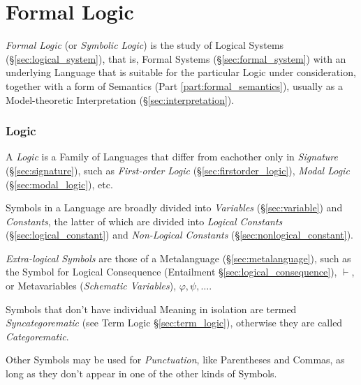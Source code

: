 \part{Formal Logic}\label{sec:formal_logic}

\emph{Formal Logic} (or \emph{Symbolic Logic}) is the study of Logical
Systems (\S\ref{sec:logical_system}), that is, Formal Systems
(\S\ref{sec:formal_system}) with an underlying Language that is
suitable for the particular Logic under consideration, together with a
form of Semantics (Part \ref{part:formal_semantics}), usually as a
Model-theoretic Interpretation (\S\ref{sec:interpretation}).



\section{Logic}\label{sec:logic}

A \emph{Logic} is a Family of Languages that differ from eachother
only in \emph{Signature} (\S\ref{sec:signature}), such as
\emph{First-order Logic} (\S\ref{sec:firstorder_logic}), \emph{Modal
  Logic} (\S\ref{sec:modal_logic}), etc.

Symbols in a Language are broadly divided into \emph{Variables}
(\S\ref{sec:variable}) and \emph{Constants}, the latter of which are
divided into \emph{Logical Constants} (\S\ref{sec:logical_constant})
and \emph{Non-Logical Constants} (\S\ref{sec:nonlogical_constant}).

\emph{Extra-logical Symbols} are those of a Metalanguage
(\S\ref{sec:metalanguage}), such as the Symbol for Logical Consequence
(Entailment \S\ref{sec:logical_consequence}), $\vdash$, or
Metavariables (\emph{Schematic Variables}), $\varphi, \psi, \ldots$.

Symbols that don't have individual Meaning in isolation are termed
\emph{Syncategorematic} (see Term Logic \S\ref{sec:term_logic}),
otherwise they are called \emph{Categorematic}.

Other Symbols may be used for \emph{Punctuation}, like Parentheses and
Commas, as long as they don't appear in one of the other kinds of
Symbols.

